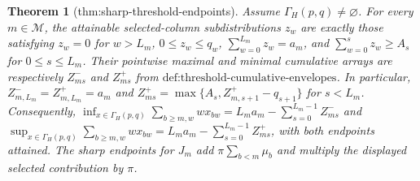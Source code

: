 \documentclass{article}
\newtheorem{theorem}{Theorem}
\begin{document}
\begin{theorem}[thm:sharp-threshold-endpoints]\label{thm:sharp-threshold-endpoints}
Assume \(\Gamma_H(p,q)\ne\varnothing\). For every \(m\in\mathcal M\), the attainable selected-column subdistributions \(z_w\) are exactly those satisfying \(z_w=0\) for \(w>L_m\), \(0\le z_w\le q_w\), \(\sum_{w=0}^{L_m}z_w=a_m\), and \(\sum_{w=0}^{s}z_w\ge A_s\) for \(0\le s\le L_m\). Their pointwise maximal and minimal cumulative arrays are respectively \(Z_{ms}^{-}\) and \(Z_{ms}^{+}\) from \(\text{def:threshold-cumulative-envelopes}\). In particular, \(Z_{m,L_m}^{-}=Z_{m,L_m}^{+}=a_m\) and \(Z_{ms}^{+}=\max\{A_s,Z_{m,s+1}^{+}-q_{s+1}\}\) for \(s<L_m\). Consequently, \(\inf_{x\in\Gamma_H(p,q)}\sum_{b\ge m,w}w x_{bw}=L_ma_m-\sum_{s=0}^{L_m-1}Z_{ms}^{-}\) and \(\sup_{x\in\Gamma_H(p,q)}\sum_{b\ge m,w}w x_{bw}=L_ma_m-\sum_{s=0}^{L_m-1}Z_{ms}^{+}\), with both endpoints attained. The sharp endpoints for \(J_m\) add \(\pi\sum_{b<m}\mu_b\) and multiply the displayed selected contribution by \(\pi\).
\end{theorem}
\end{document}
